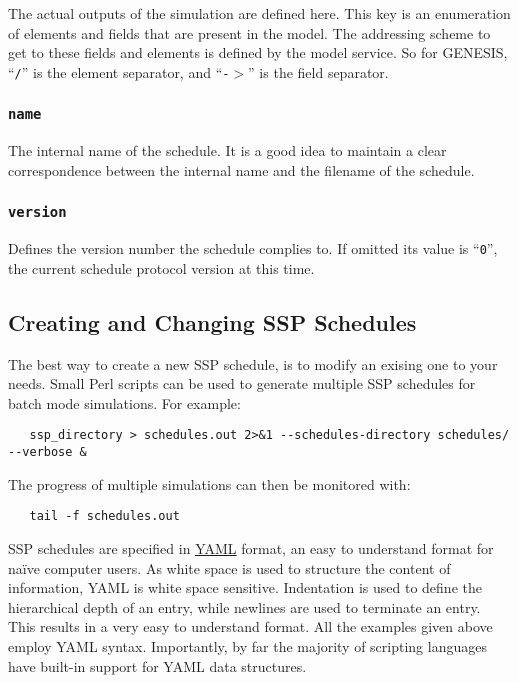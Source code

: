 \documentclass[12pt]{article}
\begin{document}
The actual outputs of the simulation are defined here. This key is an enumeration of elements and fields that are present in the model. The addressing scheme to get to these fields and elements is defined by the model service. So for GENESIS, ``{\tt /}'' is the element separator, and ``{\tt -$>$}'' is the field separator. 

\subsubsection*{\tt name}

The internal name of the schedule. It is a good idea to maintain a clear correspondence between the internal name and the filename of the schedule. 

\subsubsection*{\tt version}

Defines the version number the schedule complies to. If omitted its value is ``{\tt 0}'', the current schedule protocol version at this time. 

\subsection*{Creating and Changing SSP Schedules}

The best way to create a new SSP schedule, is to modify an exising one to your needs. Small Perl scripts can be used to generate multiple SSP schedules for batch mode simulations. For example:

\begin{verbatim}
   ssp_directory > schedules.out 2>&1 --schedules-directory schedules/ --verbose &
\end{verbatim}
The progress of multiple simulations can then be monitored with:

\begin{verbatim}
   tail -f schedules.out
\end{verbatim}
SSP schedules are specified in \href{http://www.yaml.org/}{YAML} format, an easy to understand format for na\"{i}ve computer users. As white space is  used to structure the content of information, YAML is white space sensitive. Indentation is used to define the hierarchical depth of an entry, while newlines are used to terminate an entry. This results in a very easy to understand format. All the examples given above employ YAML syntax. Importantly, by far the majority of scripting languages have built-in support for YAML data structures. 
\end{document}
